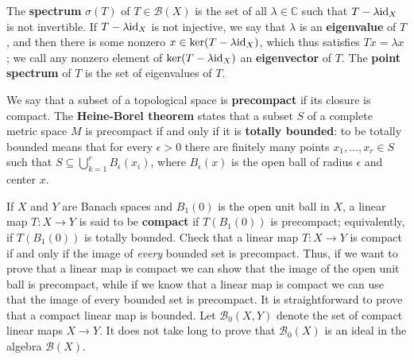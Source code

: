 \documentclass{article}
\newcommand{\id}{\ensuremath\mathrm{id}}
\begin{document}
The \textbf{spectrum} $\sigma(T)$ of $T\in \mathscr{B}(X)$ is the set of all $\lambda \in \mathbb{C}$ such that $T-\lambda \id_X$ is not invertible.
If $T-\lambda \id_X$ is not injective, we say that $\lambda$ is an \textbf{eigenvalue} of $T$, and then there is some
nonzero $x \in \ker(T-\lambda \id_X)$, which thus satisfies  $Tx=\lambda x$; we call any nonzero element of $\ker(T-\lambda \id_X)$ an \textbf{eigenvector}
of $T$. The \textbf{point spectrum} of $T$ is the set of eigenvalues of $T$.

We say that a subset of a topological space is \textbf{precompact}  if its closure is compact. The \textbf{Heine-Borel theorem} states that a subset $S$ of a complete
metric space $M$ is precompact if and only if it is \textbf{totally bounded}: to be totally bounded 
means that for every $\epsilon>0$ there are finitely many points $x_1,\ldots,x_r \in S$ such that $S \subseteq \bigcup_{k=1}^r B_\epsilon(x_i)$,
where $B_\epsilon(x)$ is the open ball of radius $\epsilon$ and center $x$.

If $X$ and $Y$ are Banach spaces and $B_1(0)$ is the open unit ball in $X$, a linear map $T:X \to Y$ is said to be \textbf{compact}
if $T(B_1(0))$ is precompact; equivalently, if $T(B_1(0))$ is totally bounded. Check that
a linear map $T:X \to Y$ is compact if and only if the image of {\em every} bounded set is precompact. Thus, if we want to prove that a linear map is compact we can
show that the image of the open unit ball is precompact, while if we know that a linear map is compact we can use that the image of every bounded set is precompact.
It is straightforward to prove that a compact linear map is bounded. Let $\mathscr{B}_0(X,Y)$ denote the set of compact linear maps
$X \to Y$. It does not take long to prove that $\mathscr{B}_0(X)$ is an ideal in the algebra $\mathscr{B}(X)$.
\end{document}
